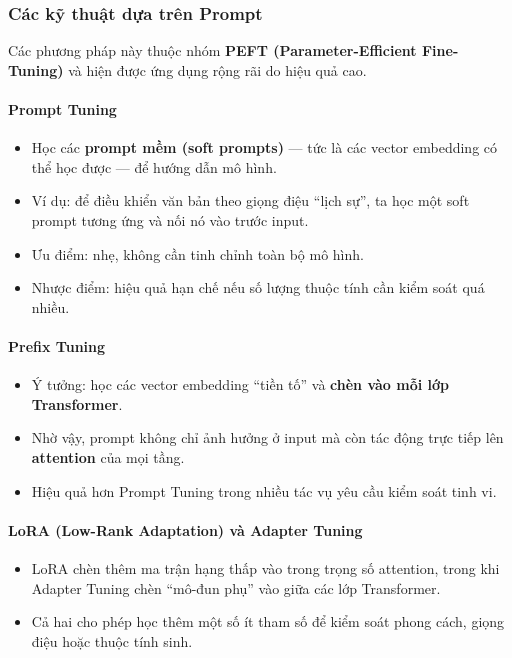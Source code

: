 \subsubsection{Các kỹ thuật dựa trên Prompt}
\label{sssec:prompt_based_controlled_generation}

Các phương pháp này thuộc nhóm \textbf{PEFT (Parameter-Efficient Fine-Tuning)} và hiện được ứng dụng rộng rãi do hiệu quả cao.

\paragraph{Prompt Tuning}
\begin{itemize}
    \item Học các \textbf{prompt mềm (soft prompts)} — tức là các vector embedding có thể học được — để hướng dẫn mô hình.
    \item Ví dụ: để điều khiển văn bản theo giọng điệu ``lịch sự'', ta học một soft prompt tương ứng và nối nó vào trước input.
    \item Ưu điểm: nhẹ, không cần tinh chỉnh toàn bộ mô hình.
    \item Nhược điểm: hiệu quả hạn chế nếu số lượng thuộc tính cần kiểm soát quá nhiều.
\end{itemize}

\paragraph{Prefix Tuning}
\begin{itemize}
    \item Ý tưởng: học các vector embedding ``tiền tố'' và \textbf{chèn vào mỗi lớp Transformer}.
    \item Nhờ vậy, prompt không chỉ ảnh hưởng ở input mà còn tác động trực tiếp lên \textbf{attention} của mọi tầng.
    \item Hiệu quả hơn Prompt Tuning trong nhiều tác vụ yêu cầu kiểm soát tinh vi.
\end{itemize}

\paragraph{LoRA (Low-Rank Adaptation) và Adapter Tuning}
\begin{itemize}
    \item LoRA chèn thêm ma trận hạng thấp vào trong trọng số attention, trong khi Adapter Tuning chèn ``mô-đun phụ'' vào giữa các lớp Transformer.
    \item Cả hai cho phép học thêm một số ít tham số để kiểm soát phong cách, giọng điệu hoặc thuộc tính sinh.
\end{itemize}

